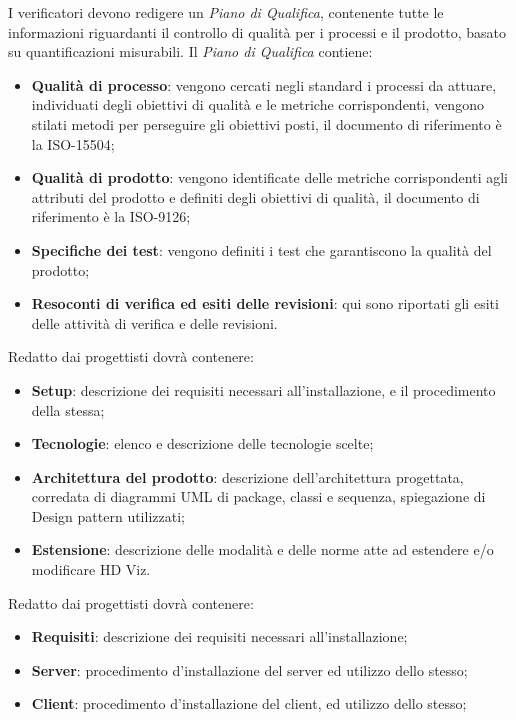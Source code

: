 			I verificatori devono redigere un \textit{Piano di Qualifica}, contenente tutte le informazioni riguardanti il controllo di qualità  per i processi e il prodotto, basato su quantificazioni misurabili. Il \textit{Piano di Qualifica} contiene:
			\begin{itemize}
			    \item \textbf{Qualità di processo}: vengono cercati negli standard i processi da attuare, individuati degli obiettivi di qualità e le metriche corrispondenti, vengono stilati metodi per perseguire gli obiettivi posti, il documento di riferimento è la ISO-15504;
			    \item \textbf{Qualità di prodotto}: vengono identificate delle metriche corrispondenti agli attributi del prodotto e definiti degli obiettivi di qualità, il documento di riferimento è la ISO-9126;
			    \item \textbf{Specifiche dei test}: vengono definiti i test che garantiscono la qualità del prodotto;
			    \item \textbf{Resoconti di verifica ed esiti delle revisioni}: qui sono riportati gli esiti delle attività di verifica e delle revisioni.
			\end{itemize}
    		Redatto dai progettisti dovrà contenere:
    		\begin{itemize}
    		    \item \textbf{Setup}: descrizione dei requisiti necessari all'installazione, e il procedimento della stessa;
    		    \item \textbf{Tecnologie}: elenco e descrizione delle tecnologie scelte;
    		    \item \textbf{Architettura del prodotto}: descrizione dell'architettura progettata, corredata di diagrammi UML di package, classi e sequenza, spiegazione di Design pattern utilizzati;
    		    \item \textbf{Estensione}: descrizione delle modalità e delle norme atte ad estendere e/o modificare HD Viz.
    		\end{itemize}
    		Redatto dai progettisti dovrà contenere:
    		\begin{itemize}
    		    \item \textbf{Requisiti}: descrizione dei requisiti necessari all'installazione;
    		    \item \textbf{Server}: procedimento d'installazione del server ed utilizzo dello stesso;
    		    \item \textbf{Client}: procedimento d'installazione del client, ed utilizzo dello stesso;
    		\end{itemize}
